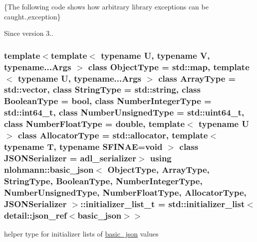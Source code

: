\{The following code shows how arbitrary library exceptions can be caught.,exception\}

\begin{DoxySince}{Since}
version 3.. 
\end{DoxySince}
\subsubsection[{\texorpdfstring{initializer\+\_\+list\+\_\+t}{initializer_list_t}}]{\setlength{\rightskip}{0pt plus 5cm}template$<$template$<$ typename U, typename V, typename...\+Args $>$ class Object\+Type = std\+::map, template$<$ typename U, typename...\+Args $>$ class Array\+Type = std\+::vector, class String\+Type  = std\+::string, class Boolean\+Type  = bool, class Number\+Integer\+Type  = std\+::int64\+\_\+t, class Number\+Unsigned\+Type  = std\+::uint64\+\_\+t, class Number\+Float\+Type  = double, template$<$ typename U $>$ class Allocator\+Type = std\+::allocator, template$<$ typename T, typename S\+F\+I\+N\+A\+E=void $>$ class J\+S\+O\+N\+Serializer = adl\+\_\+serializer$>$ using {\bf nlohmann\+::basic\+\_\+json}$<$ Object\+Type, Array\+Type, String\+Type, Boolean\+Type, Number\+Integer\+Type, Number\+Unsigned\+Type, Number\+Float\+Type, Allocator\+Type, J\+S\+O\+N\+Serializer $>$\+::{\bf initializer\+\_\+list\+\_\+t} =  std\+::initializer\+\_\+list$<${\bf detail\+::json\+\_\+ref}$<${\bf basic\+\_\+json}$>$$>$}\hypertarget{classnlohmann_1_1basic__json_a670f6a0eb3d1e0ffd00c27d35472ccc9}{}\label{classnlohmann_1_1basic__json_a670f6a0eb3d1e0ffd00c27d35472ccc9}


helper type for initializer lists of \hyperlink{classnlohmann_1_1basic__json}{basic\+\_\+json} values 

